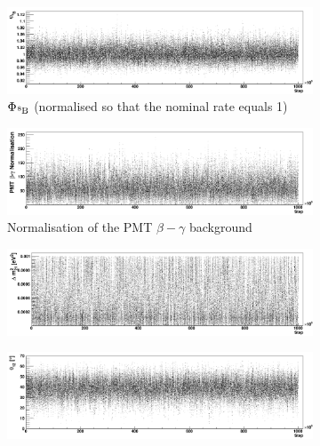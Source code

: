 \begin{figure}
    \centering
    \begin{subfigure}{0.98\textwidth}
        \centering
        \includegraphics[width=\textwidth]{6_SolarAnalysis/images/b8_flux_vs_step_MCMC_2.png}
        \caption{$\Phi_{\beight{}}$ (normalised so that the nominal rate equals 1)}
        \label{fig:b8_flux_factor_vs_step}
    \end{subfigure}
    \begin{subfigure}{0.98\textwidth}
        \centering
        \includegraphics[width=\textwidth]{6_SolarAnalysis/images/pmt_betagamma_vs_step_MCMC_2.png}
        \caption{Normalisation of the PMT $\beta-\gamma$ background}
        \label{fig:pmt_vs_step}
    \end{subfigure}
    \begin{subfigure}{0.98\textwidth}
        \centering
        \includegraphics[width=\textwidth]{6_SolarAnalysis/images/dmsq_21_vs_step_MCMC_2.png}
        \caption{\dmsq{}}
        \label{fig:dmsq_21_vs_step}
    \end{subfigure}
    \begin{subfigure}{0.98\textwidth}
        \centering
        \includegraphics[width=\textwidth]{6_SolarAnalysis/images/theta_12_vs_step_MCMC_2.png}

\end{subfigure}
\end{figure}
